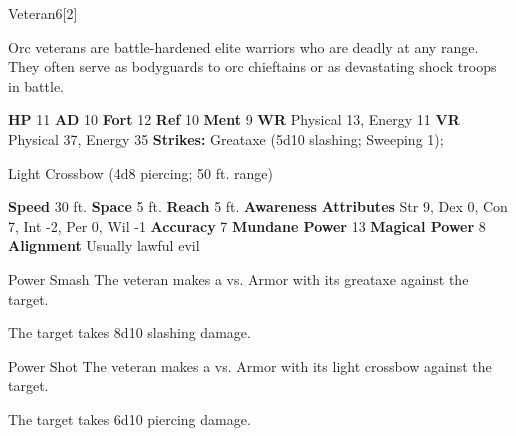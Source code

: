   \begin{monsubsection}{Veteran}{6}[2]
    \vspace{-1em}\vspace{-1em}
    \vspace{0em}

    
          Orc veterans are battle-hardened elite warriors who are deadly at any range.
          They often serve as bodyguards to orc chieftains or as devastating shock troops in battle.
        

    \begin{spellcontent}
      \begin{spelltargetinginfo}
        \pari \textbf{HP} 11 \monsep
          \textbf{AD} 10 \monsep
          \textbf{Fort} 12 \monsep
          \textbf{Ref} 10 \monsep
          \textbf{Ment} 9
        \pari \textbf{WR} Physical 13, Energy 11 \monsep
        \textbf{VR} Physical 37, Energy 35
        \pari \textbf{Strikes:}
            Greataxe  (5d10 slashing; Sweeping 1);
\par Light Crossbow  (4d8 piercing; 50 ft. range)
      \end{spelltargetinginfo}
    \end{spellcontent}
    \begin{monsterfooter}
      \pari \textbf{Speed} 30 ft. \monsep
        \textbf{Space} 5 ft. \monsep
        \textbf{Reach} 5 ft.
      \pari \textbf{Awareness} 
      \pari \textbf{Attributes}
        Str 9, Dex 0,
        Con 7, Int -2,
        Per 0, Wil -1
      \pari \textbf{Accuracy} 7 \monsep
        \textbf{Mundane Power} 13 \monsep
      \textbf{Magical Power} 8
      \pari \textbf{Alignment} Usually lawful evil
    \end{monsterfooter}
  \end{monsubsection}
  \begin{freeability}{Power Smash}
       The veteran makes a 
         vs. Armor
        with its greataxe against the target.
    
    \hit The target takes 8d10 slashing damage.
    \end{freeability}
  

    \begin{freeability}{Power Shot}
       The veteran makes a 
         vs. Armor
        with its light crossbow against the target.
    
    \hit The target takes 6d10 piercing damage.
    \end{freeability}
  

